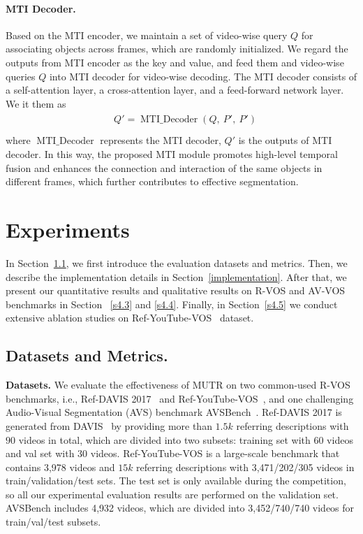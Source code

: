 \documentclass{article}
\begin{document}
\paragraph{MTI Decoder.}
Based on the MTI encoder, we maintain a set of video-wise query $Q$ for associating objects across frames, which are randomly initialized. We regard the outputs from MTI encoder as the key and value, and feed them and video-wise queries $Q$ into MTI decoder for video-wise decoding. The MTI decoder consists of a self-attention layer, a cross-attention layer, and a feed-forward network layer. We it them as
\begin{align}
\label{mti_decoder}
\begin{split}
& Q' = \operatorname{MTI\_Decoder}(Q,\ P',\ P')\\
\end{split}
\end{align}
where $\operatorname{MTI\_Decoder}$ represents the MTI decoder, $Q'$ is the outputs of MTI decoder. 
In this way, the proposed MTI module promotes high-level temporal fusion and enhances the connection and interaction of the same objects in different frames, which further contributes to effective segmentation.



\section{Experiments}

In Section~\ref{s4.1}, we first introduce the evaluation datasets and metrics. Then, we describe the implementation details in Section~\ref{implementation}.
After that, we present our quantitative results and qualitative results on R-VOS and AV-VOS benchmarks in Section ~\ref{s4.3} and \ref{s4.4}. Finally, in Section~\ref{s4.5} we conduct extensive ablation studies on Ref-YouTube-VOS~\cite{seo2020urvos} dataset.

\subsection{Datasets and Metrics.}\label{s4.1}

\textbf{Datasets.} We evaluate the effectiveness of MUTR on two common-used R-VOS benchmarks, i.e., Ref-DAVIS 2017~\cite{khoreva2019video} and Ref-YouTube-VOS~\cite{seo2020urvos}, and one challenging Audio-Visual Segmentation (AVS) benchmark AVSBench~\cite{zhou2022audio}. Ref-DAVIS 2017 is generated from DAVIS~\cite{pont20172017} by providing more than $1.5k$ referring descriptions with $90$ videos in total, which are divided into two subsets: training set with 60 videos and val set with 30 videos. Ref-YouTube-VOS is a large-scale benchmark that contains 3,978 videos and $15k$ referring descriptions with 3,471/202/305 videos in train/validation/test sets. 
The test set is only available during the competition, so all our experimental evaluation results are performed on the validation set.
AVSBench includes 4,932 videos, which are divided into 3,452/740/740 videos for train/val/test subsets. 
\end{document}
